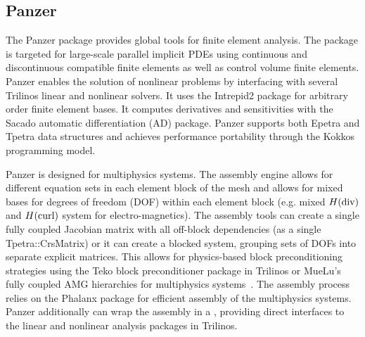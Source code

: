 \subsection{Panzer}
The Panzer package provides global tools for finite element analysis. The package is targeted for large-scale parallel implicit PDEs using continuous and discontinuous compatible finite elements as well as control volume finite elements. Panzer enables the solution of nonlinear problems by interfacing with several Trilinos linear and nonlinear solvers. It uses the Intrepid2 package for arbitrary order finite element bases. It computes derivatives and sensitivities with the Sacado automatic differentiation (AD) package. Panzer supports both Epetra and Tpetra data structures and achieves performance portability through the Kokkos programming model.

Panzer is designed for multiphysics systems. The assembly engine allows for different equation sets in each element block of the mesh and allows for mixed bases for degrees of freedom (DOF) within each element block (e.g. mixed $H(\rm{div})$ and $H(\rm{curl})$ system for electro-magnetics). The assembly tools can create a single fully coupled Jacobian matrix with all off-block dependencies (as a single Tpetra::CrsMatrix) or it can create a blocked system, grouping sets of DOFs into separate explicit matrices. This allows for physics-based block preconditioning strategies using the Teko block preconditioner package in Trilinos \cite{Bonilla2023,Cyr2016a} or MueLu's fully coupled AMG hierarchies for multiphysics systems~\cite{Ohm2022a}. The assembly process relies on the Phalanx package for efficient assembly of the multiphysics systems. Panzer additionally can wrap the assembly in a , providing direct interfaces to the linear and nonlinear analysis packages in Trilinos.

